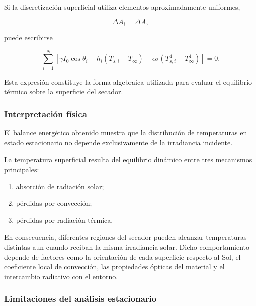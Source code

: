 Si la discretización superficial utiliza elementos aproximadamente uniformes,

\[
\Delta A_i
=
\Delta A,
\]

puede escribirse

\begin{equation}
\boxed{
\sum_{i=1}^{N}
\left[
\gamma I_0
\cos\theta_i
-
h_i(T_{s,i}-T_\infty)
-
\epsilon\sigma
(T_{s,i}^4-T_\infty^4)
\right]
=
0.
}
\end{equation}

Esta expresión constituye la forma algebraica utilizada para evaluar el equilibrio térmico sobre la superficie del secador.

\subsubsection{Interpretación física}

El balance energético obtenido muestra que la distribución de temperaturas en estado estacionario no depende exclusivamente de la irradiancia incidente.

La temperatura superficial resulta del equilibrio dinámico entre tres mecanismos principales:

\begin{enumerate}

\item absorción de radiación solar;

\item pérdidas por convección;

\item pérdidas por radiación térmica.

\end{enumerate}

En consecuencia, diferentes regiones del secador pueden alcanzar temperaturas distintas aun cuando reciban la misma irradiancia solar. Dicho comportamiento depende de factores como la orientación de cada superficie respecto al Sol, el coeficiente local de convección, las propiedades ópticas del material y el intercambio radiativo con el entorno.

\subsubsection{Limitaciones del análisis estacionario}

